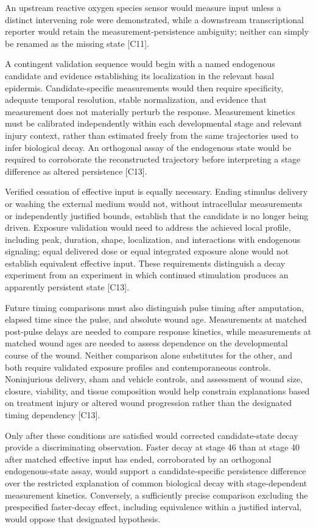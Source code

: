 \documentclass[11pt]{article}
\begin{document}
An upstream reactive oxygen species sensor would measure input unless a distinct intervening role were demonstrated, while a downstream transcriptional reporter would retain the measurement-persistence ambiguity; neither can simply be renamed as the missing state [C11].

A contingent validation sequence would begin with a named endogenous candidate and evidence establishing its localization in the relevant basal epidermis. Candidate-specific measurements would then require specificity, adequate temporal resolution, stable normalization, and evidence that measurement does not materially perturb the response. Measurement kinetics must be calibrated independently within each developmental stage and relevant injury context, rather than estimated freely from the same trajectories used to infer biological decay. An orthogonal assay of the endogenous state would be required to corroborate the reconstructed trajectory before interpreting a stage difference as altered persistence [C13].

Verified cessation of effective input is equally necessary. Ending stimulus delivery or washing the external medium would not, without intracellular measurements or independently justified bounds, establish that the candidate is no longer being driven. Exposure validation would need to address the achieved local profile, including peak, duration, shape, localization, and interactions with endogenous signaling; equal delivered dose or equal integrated exposure alone would not establish equivalent effective input. These requirements distinguish a decay experiment from an experiment in which continued stimulation produces an apparently persistent state [C13].

Future timing comparisons must also distinguish pulse timing after amputation, elapsed time since the pulse, and absolute wound age. Measurements at matched post-pulse delays are needed to compare response kinetics, while measurements at matched wound ages are needed to assess dependence on the developmental course of the wound. Neither comparison alone substitutes for the other, and both require validated exposure profiles and contemporaneous controls. Noninjurious delivery, sham and vehicle controls, and assessment of wound size, closure, viability, and tissue composition would help constrain explanations based on treatment injury or altered wound progression rather than the designated timing dependency [C13].

Only after these conditions are satisfied would corrected candidate-state decay provide a discriminating observation. Faster decay at stage 46 than at stage 40 after matched effective input has ended, corroborated by an orthogonal endogenous-state assay, would support a candidate-specific persistence difference over the restricted explanation of common biological decay with stage-dependent measurement kinetics. Conversely, a sufficiently precise comparison excluding the prespecified faster-decay effect, including equivalence within a justified interval, would oppose that designated hypothesis.
\end{document}
